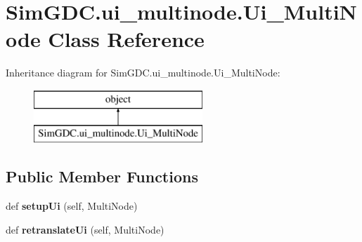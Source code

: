 \hypertarget{class_sim_g_d_c_1_1ui__multinode_1_1_ui___multi_node}{}\section{Sim\+G\+D\+C.\+ui\+\_\+multinode.\+Ui\+\_\+\+Multi\+Node Class Reference}
\label{class_sim_g_d_c_1_1ui__multinode_1_1_ui___multi_node}
Inheritance diagram for Sim\+G\+D\+C.\+ui\+\_\+multinode.\+Ui\+\_\+\+Multi\+Node\+:\begin{figure}[H]
\begin{center}
\leavevmode
\includegraphics[height=2.000000cm]{class_sim_g_d_c_1_1ui__multinode_1_1_ui___multi_node}
\end{center}
\end{figure}
\subsection*{Public Member Functions}
\begin{DoxyCompactItemize}
\item 
\hypertarget{class_sim_g_d_c_1_1ui__multinode_1_1_ui___multi_node_a346c704a6a16c2cba223cb11d0345d3b}{}def {\bfseries setup\+Ui} (self, Multi\+Node)\label{class_sim_g_d_c_1_1ui__multinode_1_1_ui___multi_node_a346c704a6a16c2cba223cb11d0345d3b}

\item 
\hypertarget{class_sim_g_d_c_1_1ui__multinode_1_1_ui___multi_node_a043bd7569f92e5d6c025db1411aabfa4}{}def {\bfseries retranslate\+Ui} (self, Multi\+Node)\label{class_sim_g_d_c_1_1ui__multinode_1_1_ui___multi_node_a043bd7569f92e5d6c025db1411aabfa4}

\end{DoxyCompactItemize}
